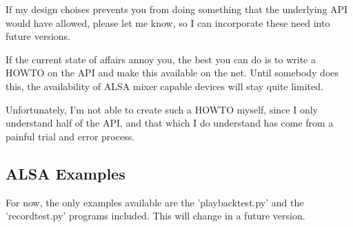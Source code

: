 If my design choises prevents you from doing something that the underlying API would have allowed,
please let me know, so I can incorporate these need into future versions.

If the current state of affairs annoy you, the best you can do is to write a HOWTO on the API and
make this available on the net. Until somebody does this, the availability of ALSA mixer capable
devices will stay quite limited.

Unfortunately, I'm not able to create such a HOWTO myself, since I only understand half of the API,
and that which I do understand has come from a painful trial and error process.



\subsection{ALSA Examples \label{pcm-example}}

For now, the only examples available are the 'playbacktest.py' and the 'recordtest.py' programs included.
This will change in a future version.
